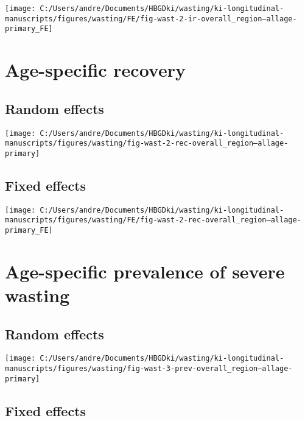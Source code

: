 \documentclass[
  9pt,
]{book}
\begin{document}
\texttt{[image: C:/Users/andre/Documents/HBGDki/wasting/ki-longitudinal-manuscripts/figures/wasting/FE/fig-wast-2-ir-overall\_region--allage-primary\_FE]}

\hypertarget{age-specific-recovery}{%
\section{Age-specific recovery}\label{age-specific-recovery}}

\hypertarget{random-effects-3}{%
\subsection{Random effects}\label{random-effects-3}}

\texttt{[image: C:/Users/andre/Documents/HBGDki/wasting/ki-longitudinal-manuscripts/figures/wasting/fig-wast-2-rec-overall\_region--allage-primary]}

\hypertarget{fixed-effects-4}{%
\subsection{Fixed effects}\label{fixed-effects-4}}

\texttt{[image: C:/Users/andre/Documents/HBGDki/wasting/ki-longitudinal-manuscripts/figures/wasting/FE/fig-wast-2-rec-overall\_region--allage-primary\_FE]}

\hypertarget{age-specific-prevalence-of-severe-wasting}{%
\section{Age-specific prevalence of severe wasting}\label{age-specific-prevalence-of-severe-wasting}}

\hypertarget{random-effects-4}{%
\subsection{Random effects}\label{random-effects-4}}

\texttt{[image: C:/Users/andre/Documents/HBGDki/wasting/ki-longitudinal-manuscripts/figures/wasting/fig-wast-3-prev-overall\_region--allage-primary]}

\hypertarget{fixed-effects-5}{%
\subsection{Fixed effects}\label{fixed-effects-5}}
\end{document}
